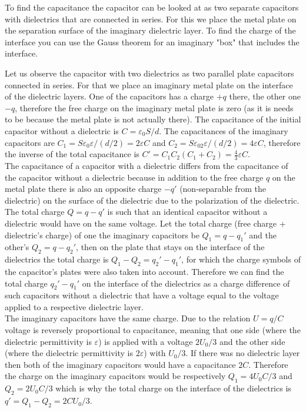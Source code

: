 \hinteng
To find the capacitance the capacitor can be looked at as two separate capacitors with dielectrics that are connected in series. For this we place the metal plate on the separation surface of the imaginary dielectric layer. To find the charge of the interface you can use the Gauss theorem for an imaginary "box" that includes the interface.

\solueng
Let us observe the capacitor with two dielectrics as two parallel plate capacitors connected in series. For that we place an imaginary metal plate on the interface of the dielectric layers. One of the capacitors has a charge $+q$ there, the other one $-q$, therefore the free charge on the imaginary metal plate is zero (as it is needs to be because the metal plate is not actually there). The capacitance of the initial capacitor without a dielectric is $C=\varepsilon_0S/d$. The capacitances of the imaginary capacitors are $C_1=S\varepsilon_0\varepsilon/(d/2)=2\varepsilon C$ and $C_2=S\varepsilon_02\varepsilon/(d/2)=4\varepsilon C$, therefore the inverse of the total capacitance is $C'=C_1C_2(C_1+C_2)=\frac 43\varepsilon C$. \\
The capacitance of a capacitor with a dielectric differs from the capacitance of the capacitor without a dielectric because in addition to the free charge $q$ on the metal plate there is also an opposite charge $-q'$ (non-separable from the dielectric) on the surface of the dielectric due to the polarization of the dielectric. The total charge $Q=q-q'$ is such that an identical capacitor without a dielectric would have on the same voltage. Let the total charge (free charge + dielectric’s charge) of one the imaginary capacitors be $Q_1=q-q_1'$ and the other’s $Q_2=q-q_2'$, then on the plate that stays on the interface of the dielectrics the total charge is $Q_1-Q_2=q_2'-q_1'$, for which the charge symbols of the capacitor’s plates were also taken into account. Therefore we can find the total charge $q_2'-q_1'$ on the interface of the dielectrics as a charge difference of such capacitors without a dielectric that have a voltage equal to the voltage applied to a respective dielectric layer.\\
The imaginary capacitors have the same charge. Due to the relation $U=q/C$ voltage is reversely proportional to capacitance, meaning that one side (where the dielectric permittivity is $\varepsilon$) is applied with a voltage $2U_0/3$ and the other side (where the dielectric permittivity is $2\varepsilon$) with $U_0/3$. If there was no dielectric layer then both of the imaginary capacitors would have a capacitance $2C$. Therefore the charge on the imaginary capacitors would be respectively $Q_1=4U_0C/3$ and $Q_2=2U_0C/3$ which is why the total charge on the interface of the dielectrics is $q'=Q_1-Q_2=2CU_0/3$.\\

